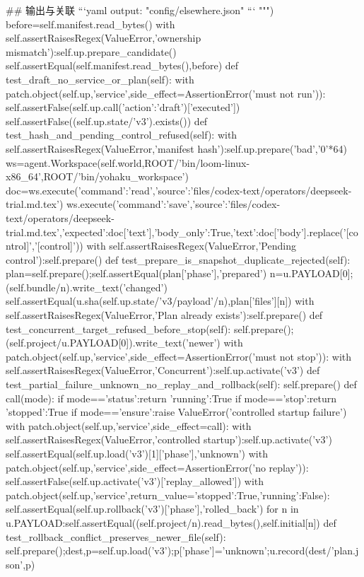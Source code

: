 ## 输出与关联
```yaml
output: "config/elsewhere.json"
```
""")
  before=self.manifest.read_bytes()
  with self.assertRaisesRegex(ValueError,'ownership mismatch'):self.up.prepare_candidate()
  self.assertEqual(self.manifest.read_bytes(),before)
 def test_draft_no_service_or_plan(self):
  with patch.object(self.up,'service',side_effect=AssertionError('must not run')):
   self.assertFalse(self.up.call({'action':'draft'})['executed'])
  self.assertFalse((self.up.state/'v3').exists())
 def test_hash_and_pending_control_refused(self):
  with self.assertRaisesRegex(ValueError,'manifest hash'):self.up.prepare('bad','0'*64)
  ws=agent.Workspace(self.world,ROOT/'bin/loom-linux-x86_64',ROOT/'bin/yohaku_workspace')
  doc=ws.execute({'command':'read','source':'files/codex-text/operators/deepseek-trial.md.tex'})
  ws.execute({'command':'save','source':'files/codex-text/operators/deepseek-trial.md.tex','expected':doc['text'],'body_only':True,'text':doc['body'].replace('[control]\ndraft','[control]\nka')})
  with self.assertRaisesRegex(ValueError,'Pending control'):self.prepare()
 def test_prepare_is_snapshot_duplicate_rejected(self):
  plan=self.prepare();self.assertEqual(plan['phase'],'prepared')
  n=u.PAYLOAD[0];(self.bundle/n).write_text('changed')
  self.assertEqual(u.sha(self.up.state/'v3/payload'/n),plan['files'][n])
  with self.assertRaisesRegex(ValueError,'Plan already exists'):self.prepare()
 def test_concurrent_target_refused_before_stop(self):
  self.prepare();(self.project/u.PAYLOAD[0]).write_text('newer')
  with patch.object(self.up,'service',side_effect=AssertionError('must not stop')):
   with self.assertRaisesRegex(ValueError,'Concurrent'):self.up.activate('v3')
 def test_partial_failure_unknown_no_replay_and_rollback(self):
  self.prepare()
  def call(mode):
   if mode=='status':return {'running':True}
   if mode=='stop':return {'stopped':True}
   if mode=='ensure':raise ValueError('controlled startup failure')
  with patch.object(self.up,'service',side_effect=call):
   with self.assertRaisesRegex(ValueError,'controlled startup'):self.up.activate('v3')
  self.assertEqual(self.up.load('v3')[1]['phase'],'unknown')
  with patch.object(self.up,'service',side_effect=AssertionError('no replay')):
   self.assertFalse(self.up.activate('v3')['replay_allowed'])
  with patch.object(self.up,'service',return_value={'stopped':True,'running':False}):
   self.assertEqual(self.up.rollback('v3')['phase'],'rolled_back')
  for n in u.PAYLOAD:self.assertEqual((self.project/n).read_bytes(),self.initial[n])
 def test_rollback_conflict_preserves_newer_file(self):
  self.prepare();dest,p=self.up.load('v3');p['phase']='unknown';u.record(dest/'plan.json',p)
